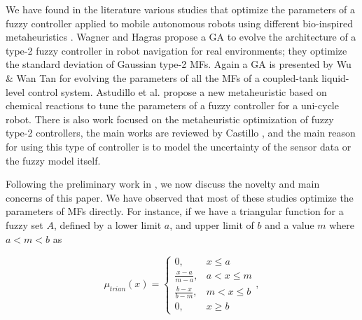 \documentclass[symmetry,article,submit,moreauthors,pdftex]{Definitions/mdpi}
\begin{document}

We have found in the literature various studies that optimize the parameters of
a fuzzy controller applied to mobile autonomous robots using different
bio-inspired metaheuristics
\cite{hernandez_optimization_2019,lagunes_methodology_2017}.  Wagner and Hagras
\cite{wagner2007genetic} propose a GA to evolve the architecture of a type-2
fuzzy controller in robot navigation for real environments; they optimize the
standard deviation of Gaussian type-2 MFs.  Again a GA is presented by Wu \&
Wan Tan \cite{wu2006genetic} for evolving the parameters of all the MFs of a
coupled-tank liquid-level control system.  Astudillo et al.
\cite{astudillo2013optimization} propose a new metaheuristic based on chemical
reactions to tune the parameters of a fuzzy controller for a uni-cycle robot.
There is also work focused on the metaheuristic optimization of fuzzy type-2
controllers, the main works are reviewed by Castillo
\cite{castillo_review_2012}, and the main reason for using this type of
controller is to model the uncertainty of the sensor data or the fuzzy model
itself.

Following the preliminary work in
\cite{mancilla2022tracking,Mancilla2021}, we now discuss the novelty and main
concerns of this paper. 
We have observed that most of these studies optimize the parameters of MFs
directly. For instance, if we have a triangular function for a fuzzy set $A$,
defined by a lower limit $a$, and upper limit of $b$ and a value $m$ where $a <
m <b$ as 

\begin{equation}\label{eq:triangular}
\mu_{trian}(x) = 
\begin{cases}
    0, & x \le a \\
    \frac{x-a}{m-a}, & a < x \le m \\ 
    \frac{b-x}{b-m}, & m < x \le b \\ 
    0, & x \ge b
\end{cases},
\end{equation}
\end{document}
